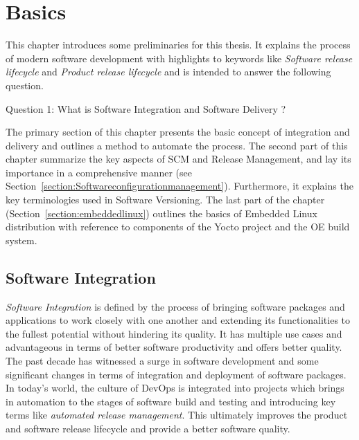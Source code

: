 
\chapter{Basics} %

\label{Chapter2} %

This chapter introduces some preliminaries for this thesis. It explains the process of modern software development with highlights to keywords like \emph{Software release lifecycle} and \emph{Product release lifecycle} and is intended to answer the following question.

\vspace{0.5cm}
\noindent Question 1: What is Software Integration and Software Delivery ?
\vspace{0.5cm}


\noindent The primary section of this chapter presents the basic concept of integration and delivery and outlines a method to automate the process. The second part of this chapter summarize the key aspects of \ac{SCM} and Release Management, and lay its importance in a comprehensive manner (see Section~\ref{section:Softwareconfigurationmanagement}). Furthermore, it explains the key terminologies used in Software Versioning. The last part of the chapter (Section~\ref{section:embeddedlinux}) outlines the basics of Embedded Linux distribution with reference to components of the Yocto project and the \ac{OE} build system. 




\section{Software Integration}\label{section:SoftwareIntegration}
\emph{Software Integration} is defined by the process of bringing software packages and applications to work closely with one another and extending its functionalities to the fullest potential without hindering its quality. It has multiple use cases and advantageous in terms of better software productivity and offers better quality. The past decade has witnessed a surge in software development and some significant changes in terms of integration and deployment of software packages. In today’s world, the culture of DevOps is integrated into projects which brings in automation to the stages of software build and testing and introducing key terms like \emph{automated release management}. This ultimately improves the product and software release lifecycle and provide a better software quality.    

